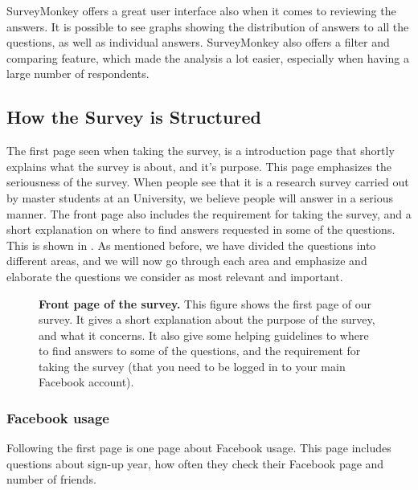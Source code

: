 SurveyMonkey offers a great user interface also when it comes to reviewing the answers. It is possible to see graphs showing the distribution of answers to all the questions, as well as individual answers. SurveyMonkey also offers a filter and comparing feature, which made the analysis a lot easier, especially when having a large number of respondents. 

\subsection{How the Survey is Structured} 
The first page seen when taking the survey, is a introduction page that shortly explains what the survey is about, and it's purpose. This page emphasizes the seriousness of the survey. When people see that it is a research survey carried out by master students at an University, we believe people will answer in a serious manner. The front page also includes the requirement for taking the survey, and a short explanation on where to find answers requested in some of the questions. This is shown in . As mentioned before, we have divided the questions into different areas, and we will now go through each area and emphasize and elaborate the questions we consider as most relevant and important. 
 
\begin{figure}[h!]
\centering
{}
\caption[Front page of the survey]{\textbf{Front page of the survey.} This figure shows the first page of our survey. It gives a short explanation about the purpose of the survey, and what it concerns. It also give some helping guidelines to where to find answers to some of the questions, and the requirement for taking the survey (that you need to be logged in to your main Facebook account).} 
\label{fig:frontpage}
\end{figure}

\subsubsection{Facebook usage}
Following the first page is one page about Facebook usage. This page includes questions about sign-up year, how often they check their Facebook page and number of friends. 

